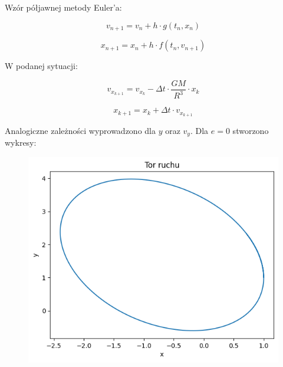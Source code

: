 \documentclass{article}
\begin{document}
	Wzór półjawnej metody Euler'a:

	\begin{equation}
		v_{n+1} = v_n + h \cdot g(t_n, x_n)
	\end{equation}

	\begin{equation}
		x_{n+1} = x_n + h \cdot f(t_n, v_{n+1})
	\end{equation}

	W podanej sytuacji:

	\begin{equation}
		v_{x_{k+1}} = v_{x_k} - \Delta t \cdot \frac{GM}{R^3} \cdot x_k
	\end{equation}

	\begin{equation}
		x_{k+1} = x_k + \Delta t \cdot v_{x_{k+1}} 
	\end{equation}

	\newpage

	Analogiczne zależności wyprowadzono dla $y$ oraz $v_y$. Dla $e = 0$ stworzono wykresy:

	
	\begin{figure}[h]
		\centering
		\includegraphics[scale = 0.5]{wykres5.png}
	\end{figure}
\end{document}
